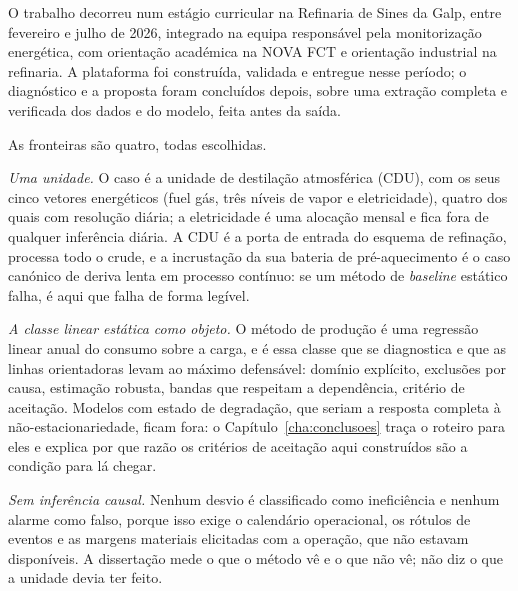O trabalho decorreu num estágio curricular na Refinaria de Sines da
Galp, entre fevereiro e julho de 2026, integrado na equipa responsável
pela monitorização energética, com orientação académica na NOVA FCT e
orientação industrial na refinaria. A plataforma foi construída,
validada e entregue nesse período; o diagnóstico e a proposta foram
concluídos depois, sobre uma extração completa e verificada dos dados e
do modelo, feita antes da saída.

As fronteiras são quatro, todas escolhidas.

\emph{Uma unidade.} O caso é a unidade de destilação atmosférica (CDU),
com os seus cinco vetores energéticos (fuel gás, três níveis de vapor e
eletricidade), quatro dos quais com resolução diária; a
eletricidade é uma alocação mensal e fica fora de qualquer inferência
diária. A CDU é a porta de entrada do esquema de refinação, processa
todo o crude, e a incrustação da sua bateria de pré-aquecimento é o
caso canónico de deriva lenta em processo contínuo: se um método de
\emph{baseline} estático falha, é aqui que falha de forma legível.

\emph{A classe linear estática como objeto.} O método de produção é uma
regressão linear anual do consumo sobre a carga, e é essa classe que se
diagnostica e que as linhas orientadoras levam ao máximo defensável:
domínio explícito, exclusões por causa, estimação robusta, bandas que
respeitam a dependência, critério de aceitação. Modelos com estado de
degradação, que seriam a resposta completa à não-estacionariedade,
ficam fora: o Capítulo~\ref{cha:conclusoes} traça o roteiro para eles e
explica por que razão os critérios de aceitação aqui construídos são a
condição para lá chegar.

\emph{Sem inferência causal.} Nenhum desvio é classificado como
ineficiência e nenhum alarme como falso, porque isso exige o calendário
operacional, os rótulos de eventos e as margens materiais elicitadas
com a operação, que não estavam disponíveis. A dissertação mede o que o
método vê e o que não vê; não diz o que a unidade devia ter feito.

